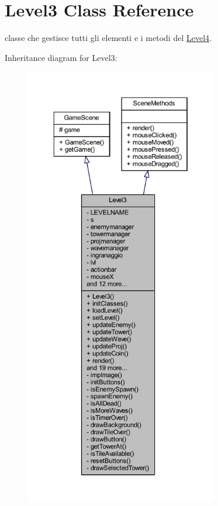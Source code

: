 \hypertarget{classscenes_1_1_level3}{}\section{Level3 Class Reference}
\label{classscenes_1_1_level3}


classe che gestisce tutti gli elementi e i metodi del \hyperlink{classscenes_1_1_level4}{Level4}.  




Inheritance diagram for Level3\+:\nopagebreak
\begin{figure}[H]
\begin{center}
\leavevmode
\includegraphics[height=550pt]{classscenes_1_1_level3__inherit__graph}
\end{center}
\end{figure}


